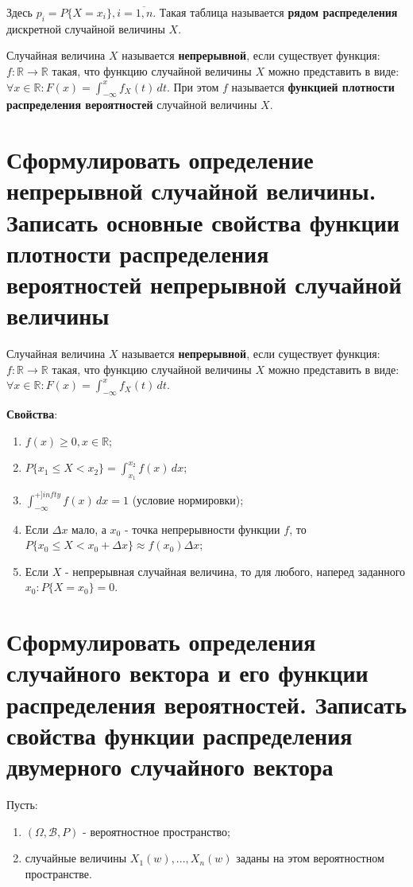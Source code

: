 Здесь $p_i = P\{X=x_i\}, i = \overline{1, n}$. Такая таблица называется \textbf{рядом распределения} дискретной случайной величины $X$.

Случайная величина $X$ называется \textbf{непрерывной}, если существует функция: $f: \mathbb{R} \rightarrow \mathbb{R}$ такая, что функцию случайной величины $X$ можно представить в виде: $\forall x \in \mathbb{R}: F(x) = \int_{-\infty}^{x} f_X(t) \, dt$. При этом $f$ называется \textbf{функцией плотности распределения вероятностей} случайной величины $X$.

\section{Сформулировать определение непрерывной случайной величины. Записать основные свойства функции плотности распределения вероятностей непрерывной случайной величины}

Случайная величина $X$ называется \textbf{непрерывной}, если существует функция: $f: \mathbb{R} \rightarrow \mathbb{R}$ такая, что функцию случайной величины $X$ можно представить в виде: $\forall x \in \mathbb{R}: F(x) = \int_{-\infty}^{x} f_X(t) \, dt$.

\textbf{Свойства}:
\begin{enumerate}
	\item $f(x) \geq 0, x \in \mathbb{R}$;
	\item $P\{x_1 \leq X < x_2\} = \int_{x_1}^{x_2} f(x) \, dx$;
	\item $\int_{-\infty}^{+]infty} f(x) \, dx = 1$ (условие нормировки);
	\item Если $\Delta x$ мало, а $x_0$ - точка непрерывности функции $f$, то $P\{x_0 \leq X < x_0 + \Delta x\} \approx f(x_0)\Delta x$;
	\item Если $X$ - непрерывная случайная величина, то для любого, наперед заданного $x_0: P\{X=x_0\} = 0$.
\end{enumerate}

\section{Сформулировать определения случайного вектора и его функции распределения вероятностей. Записать свойства функции распределения двумерного случайного вектора}

Пусть:
\begin{enumerate}
	\item $(\Omega, \mathcal{B}, P)$ - вероятностное пространство;
	\item случайные величины $X_1(w), ..., X_n(w)$ заданы на этом вероятностном пространстве.
\end{enumerate}

